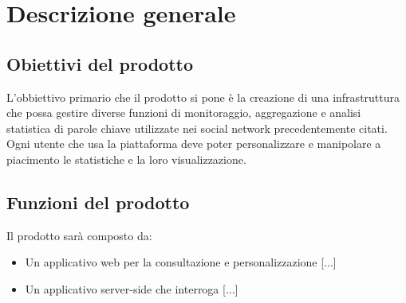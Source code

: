 %


\section{Descrizione generale}

\subsection{Obiettivi del prodotto}
L'obbiettivo primario che il prodotto si pone è la creazione di una infrastruttura che
possa gestire diverse funzioni di monitoraggio, aggregazione e analisi statistica di parole chiave utilizzate nei social network precedentemente citati. Ogni utente che usa la piattaforma deve poter personalizzare e manipolare a piacimento le statistiche e la loro visualizzazione.

\subsection{Funzioni del prodotto}
Il prodotto sarà composto da:
\begin{itemize}
\item Un applicativo web per la consultazione e personalizzazione [...]
\item Un applicativo server-side che interroga [...]
\end{itemize}


